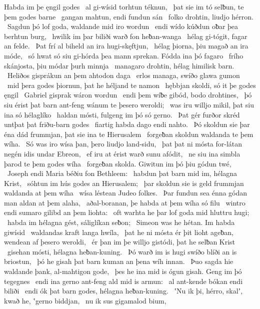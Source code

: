 Habda im þe ęngil godes \hld\ al gi-wísid
torhtun téknun, \hld\ þat sie im tó selƀun,
te þem godes barne \hld\ gangan mahtun,
endi fundun sán \hld\ folko drohtin,
liudjo hérron. \hld\ Sagdun þó lof goda,
waldande mid iro wordun \hld\ endi wído kúðdun
oƀar þea berhtun burg, \hld\ hwilik im þar biliði warð
fon heƀan-wanga \hld\ hélag gi-tógit,
fagar an felde. \hld\ Þat frí al biheld
an ira hugi-skęftjun, \hld\ hélag þiorna,
þiu magað an ira móde, \hld\ só hwat só siu gi-hórda þea mann sprekan.
Fódda ina þó fagaro \hld\ frího skánjosta,
þiu módar þurh minnja \hld\ managaro drohtin,
hélag himilisk barn. \hld\ Heliðos gisprákun
an þem ahtodon daga \hld\ erlos managa,
swíðo glawa gumon \hld\ mid þera godes þiornun,
þat he héljand te namon \hld\ hębbjan skoldi,
só it þe godes ęngil \hld\ Gabriel gisprak
wáron wordun \hld\ endi þem wíƀe gibód,
bodo drohtines, \hld\ þó siu érist þat barn ant-feng
wánum te þesero weroldi; \hld\ was iru willjo mikil,
þat siu ina só hélaglíko \hld\ haldan mósti,
fulgeng im þó só gerno. \hld\ Þat gér furðor skréd
untþat þat friðu-barn godes \hld\ fiartig habda
dago endi nahto. \hld\ Þó skoldun sie þar éna dád frummjan,
þat sie ina te Hierusalem \hld\ forgeƀan skoldun
waldanda te þem wíha. \hld\ Só was iro wísa þan,
þero liudjo land-sidu, \hld\ þat þat ni mósta for-látan negén
idis undar Ebreon, \hld\ ef iru at érist warð
sunu afódit, \hld\ ne siu ina simbla þarod
te þem godes wíha \hld\ forgeƀan skolda.
Giwitun im þó þiu gódun twé, \hld\ Joseph endi Maria
béðiu fon Bethleem: \hld\ habdun þat barn mid im,
hélagna Krist, \hld\ sóhtun im hús godes
an Hierusalem; \hld\ þar skoldun sie is geld frummjan
waldanda at þem wíha \hld\ wísa léstean
Judeo folkes. \hld\ Þar fundun sea énna gódan man
aldan at þem alaha, \hld\ aðal-boranan,
þe habda at þem wíha só filu \hld\ wintro endi sumaro
gilibd an þem liohta: \hld\ oft warhta he þar lof goda
mid hluttru hugi; \hld\ habda im hélagna gést,
sáliglíkan seƀon; \hld\ Simeon was he hétan.
Im habda giwísid \hld\ waldandas kraft
langa hwíla, \hld\ þat he ni mósta ér þit lioht ageƀan,
wendean af þesero weroldi, \hld\ ér þan im þe willjo gistódi,
þat he selƀan Krist \hld\ gisehan mósti,
hélagna heƀan-kuning. \hld\ Þó warð im is hugi swíðo
blíði an is briostun, \hld\ þó he gisah þat barn kuman
an þena wíh innan. \hld\ Þuo sagda hie waldande þank,
al-mahtigon gode, \hld\ þes he ina mid is ógun gisah.
Geng im þó tegegnes \hld\ endi ina gerno ant-feng
ald mid is armun: \hld\ al ant-kende
bókan endi biliði \hld\ endi ók þat barn godes,
hélagna heƀan-kuning. \hld\ ʽNu ik þi, hérro, skalʼ, kwað he,
ʽgerno biddjan, \hld\ nu ik sus gigamalod bium,
